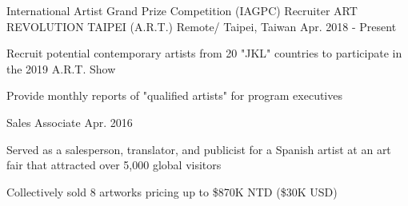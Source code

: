

\begin{cventries}
  \cventry
    {International Artist Grand Prize Competition (IAGPC) Recruiter} %
    {ART REVOLUTION TAIPEI (A.R.T.)} %
    {Remote/ Taipei, Taiwan} %
    {Apr. 2018 - Present} %
    {
      \begin{cvitems} %
        \item {Recruit potential contemporary artists from 20 "JKL" countries to participate in the 2019 A.R.T. Show}
        \item{Provide monthly reports of "qualified artists" for program executives}
      \end{cvitems}
    }






  \cventry
    {Sales Associate} %
    {} %
    {} %
    {Apr. 2016} %
    {
      \begin{cvitems} %
        \item {Served as a salesperson, translator, and publicist for a Spanish artist at an art fair that attracted over 5,000 global visitors}
        \item{Collectively sold 8 artworks pricing up to \$870K NTD (\$30K USD)}
      \end{cvitems}
    }

\end{cventries}

